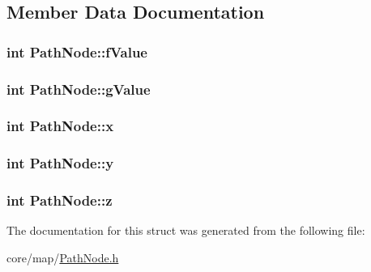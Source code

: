 \subsection{Member Data Documentation}
\hypertarget{structPathNode_a6599b3700d0500aa34acf196649bce51}{
\subsubsection[{f\-Value}]{\setlength{\rightskip}{0pt plus 5cm}int Path\-Node\-::f\-Value}}\label{structPathNode_a6599b3700d0500aa34acf196649bce51}
\hypertarget{structPathNode_a90b21e2f0cf6142db81e7753f582b1cc}{
\subsubsection[{g\-Value}]{\setlength{\rightskip}{0pt plus 5cm}int Path\-Node\-::g\-Value}}\label{structPathNode_a90b21e2f0cf6142db81e7753f582b1cc}
\hypertarget{structPathNode_a261418246914f0b5161419061859afb8}{
\subsubsection[{x}]{\setlength{\rightskip}{0pt plus 5cm}int Path\-Node\-::x}}\label{structPathNode_a261418246914f0b5161419061859afb8}
\hypertarget{structPathNode_a1dba178e234b0a1e499e408985400107}{
\subsubsection[{y}]{\setlength{\rightskip}{0pt plus 5cm}int Path\-Node\-::y}}\label{structPathNode_a1dba178e234b0a1e499e408985400107}
\hypertarget{structPathNode_ada356a6ae5e9463c3bf730a161639937}{
\subsubsection[{z}]{\setlength{\rightskip}{0pt plus 5cm}int Path\-Node\-::z}}\label{structPathNode_ada356a6ae5e9463c3bf730a161639937}


The documentation for this struct was generated from the following file\-:\begin{DoxyCompactItemize}
\item 
core/map/\hyperlink{PathNode_8h}{Path\-Node.\-h}\end{DoxyCompactItemize}
